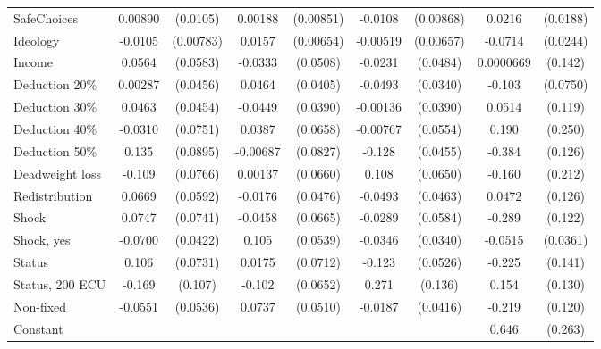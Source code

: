\begin{tabular}{l|cccccc|cc}
SafeChoices     &  0.00890         & (0.0105)&  0.00188         &(0.00851)&  -0.0108         &(0.00868)&   0.0216         & (0.0188)\\
Ideology        &  -0.0105         &(0.00783)&   0.0157\sym{**} &(0.00654)& -0.00519         &(0.00657)&  -0.0714\sym{***}& (0.0244)\\
Income          &   0.0564         & (0.0583)&  -0.0333         & (0.0508)&  -0.0231         & (0.0484)&0.0000669         &  (0.142)\\
Deduction 20\%&  0.00287         & (0.0456)&   0.0464         & (0.0405)&  -0.0493         & (0.0340)&   -0.103         & (0.0750)\\
Deduction 30\%&   0.0463         & (0.0454)&  -0.0449         & (0.0390)& -0.00136         & (0.0390)&   0.0514         &  (0.119)\\
Deduction 40\%&  -0.0310         & (0.0751)&   0.0387         & (0.0658)& -0.00767         & (0.0554)&    0.190         &  (0.250)\\
Deduction 50\%&    0.135         & (0.0895)& -0.00687         & (0.0827)&   -0.128\sym{***}& (0.0455)&   -0.384\sym{***}&  (0.126)\\
Deadweight loss&   -0.109         & (0.0766)&  0.00137         & (0.0660)&    0.108\sym{*}  & (0.0650)&   -0.160         &  (0.212)\\
Redistribution&   0.0669         & (0.0592)&  -0.0176         & (0.0476)&  -0.0493         & (0.0463)&   0.0472         &  (0.126)\\
Shock         &   0.0747         & (0.0741)&  -0.0458         & (0.0665)&  -0.0289         & (0.0584)&   -0.289\sym{**} &  (0.122)\\
Shock, yes    &  -0.0700\sym{*}  & (0.0422)&    0.105\sym{*}  & (0.0539)&  -0.0346         & (0.0340)&  -0.0515         & (0.0361)\\
Status        &    0.106         & (0.0731)&   0.0175         & (0.0712)&   -0.123\sym{**} & (0.0526)&   -0.225         &  (0.141)\\
Status, 200 ECU&   -0.169         &  (0.107)&   -0.102         & (0.0652)&    0.271\sym{**} &  (0.136)&    0.154         &  (0.130)\\
Non-fixed     &  -0.0551         & (0.0536)&   0.0737         & (0.0510)&  -0.0187         & (0.0416)&   -0.219\sym{*}  &  (0.120)\\
Constant        &                  &         &                  &         &                  &         &    0.646\sym{**} &  (0.263)\\

\end{tabular}

